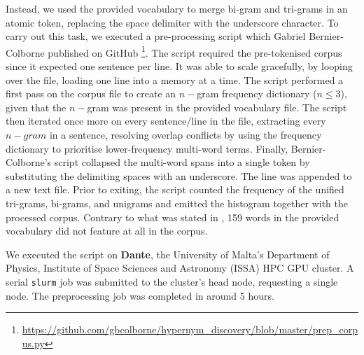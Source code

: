 Instead, we used the provided vocabulary to merge bi-gram and tri-grams in an atomic token, replacing the space delimiter with the underscore character.  To carry out this task, we executed a pre-processing script which Gabriel Bernier-Colborne published on GitHub \footnote{\url{https://github.com/gbcolborne/hypernym_discovery/blob/master/prep_corpus.py}}.  The script required the pre-tokenised corpus since it expected one sentence per line.  It was able to scale gracefully, by looping over the file, loading one line into a memory at a time.  The script performed a first pass on the corpus file to create an $n-$gram frequency dictionary ($n \leq 3$), given that the $n-$gram was present in the provided vocabulary file. The script then iterated once more on every sentence/line in the file, extracting every $n-gram$ in a sentence, resolving overlap conflicts by using the frequency dictionary to prioritise lower-frequency multi-word terms.  Finally, Bernier-Colborne's script collapsed the multi-word spans into a single token by substituting the delimiting spaces with an underscore.  The line was appended to a new text file.  Prior to exiting, the script counted the frequency of the unified tri-grams, bi-grams, and unigrams and emitted the histogram together with the processed corpus.  Contrary to what was stated in \citep{camacho2018semeval}, 159 words in the provided vocabulary did not feature at all in the corpus.

We executed the script on \textbf{Dante}, the University of Malta's Department of Physics, Institute of Space Sciences and Astronomy (ISSA) HPC GPU cluster.  A serial \texttt{slurm} job was submitted to the cluster's head node, requesting a single node.  The preprocessing job was completed in around 5 hours.

